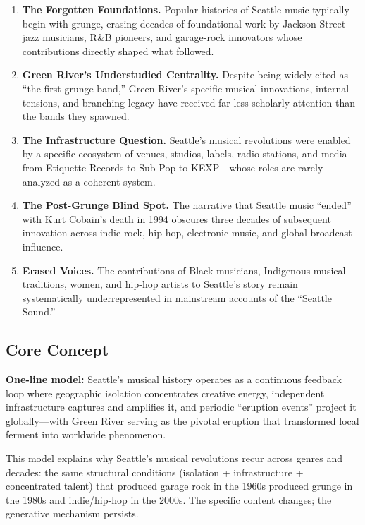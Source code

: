 \documentclass[11pt,letterpaper]{article}
\begin{document}
\begin{enumerate}[label=\textbf{\arabic*.}]
  \item \textbf{The Forgotten Foundations.} Popular histories of Seattle music typically begin with grunge, erasing decades of foundational work by Jackson Street jazz musicians, R\&B pioneers, and garage-rock innovators whose contributions directly shaped what followed.
  \item \textbf{Green River's Understudied Centrality.} Despite being widely cited as ``the first grunge band,'' Green River's specific musical innovations, internal tensions, and branching legacy have received far less scholarly attention than the bands they spawned.
  \item \textbf{The Infrastructure Question.} Seattle's musical revolutions were enabled by a specific ecosystem of venues, studios, labels, radio stations, and media---from Etiquette Records to Sub Pop to KEXP---whose roles are rarely analyzed as a coherent system.
  \item \textbf{The Post-Grunge Blind Spot.} The narrative that Seattle music ``ended'' with Kurt Cobain's death in 1994 obscures three decades of subsequent innovation across indie rock, hip-hop, electronic music, and global broadcast influence.
  \item \textbf{Erased Voices.} The contributions of Black musicians, Indigenous musical traditions, women, and hip-hop artists to Seattle's story remain systematically underrepresented in mainstream accounts of the ``Seattle Sound.''
\end{enumerate}

\subsection{Core Concept}

\textbf{One-line model:} Seattle's musical history operates as a continuous feedback loop where geographic isolation concentrates creative energy, independent infrastructure captures and amplifies it, and periodic ``eruption events'' project it globally---with Green River serving as the pivotal eruption that transformed local ferment into worldwide phenomenon.

This model explains why Seattle's musical revolutions recur across genres and decades: the same structural conditions (isolation + infrastructure + concentrated talent) that produced garage rock in the 1960s produced grunge in the 1980s and indie/hip-hop in the 2000s. The specific content changes; the generative mechanism persists.
\end{document}
